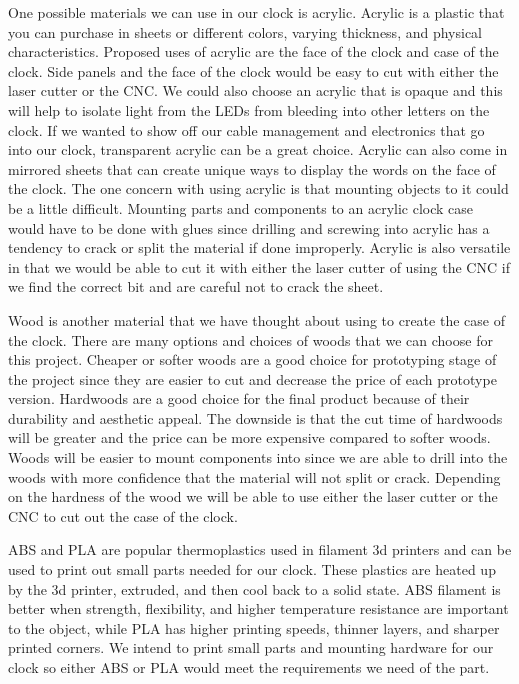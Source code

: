 \documentclass[onecolumn, draftclsnofoot,10pt, compsoc]{IEEEtran}
\begin{document}
One possible materials we can use in our clock is acrylic.
Acrylic is a plastic that you can purchase in sheets or different colors, varying thickness, and physical characteristics.
Proposed uses of acrylic are the face of the clock and case of the clock.
Side panels and the face of the clock would be easy to cut with either the laser cutter or the CNC.
We could also choose an acrylic that is opaque and this will help to isolate light from the LEDs from bleeding into other letters on the clock.
If we wanted to show off our cable management and electronics that go into our clock, transparent acrylic can be a great choice.
Acrylic can also come in mirrored sheets that can create unique ways to display the words on the face of the clock.
The one concern with using acrylic is that mounting objects to it could be a little difficult.
Mounting parts and components to an acrylic clock case would have to be done with glues since drilling and screwing into acrylic has a tendency to crack or split the material if done improperly.
Acrylic is also versatile in that we would be able to cut it with either the laser cutter of using the CNC if we find the correct bit and are careful not to crack the sheet.

Wood is another material that we have thought about using to create the case of the clock.
There are many options and choices of woods that we can choose for this project.
Cheaper or softer woods are a good choice for prototyping stage of the project since they are easier to cut and decrease the price of each prototype version. Hardwoods are a good choice for the final product because of their durability and aesthetic appeal.
The downside is that the cut time of hardwoods will be greater and the price can be more expensive compared to softer woods.
Woods will be easier to mount components into since we are able to drill into the woods with more confidence that the material will not split or crack.
Depending on the hardness of the wood we will be able to use either the laser cutter or the CNC to cut out the case of the clock.

ABS and PLA are popular thermoplastics used in filament 3d printers and can be used to print out small parts needed for our clock.
These plastics are heated up by the 3d printer, extruded, and then cool back to a solid state.
ABS filament is better when strength, flexibility, and higher temperature resistance are important to the object, while PLA has higher printing speeds, thinner layers, and sharper printed corners.
We intend to print small parts and mounting hardware for our clock so either ABS or PLA would meet the requirements we need of the part.
\end{document}

